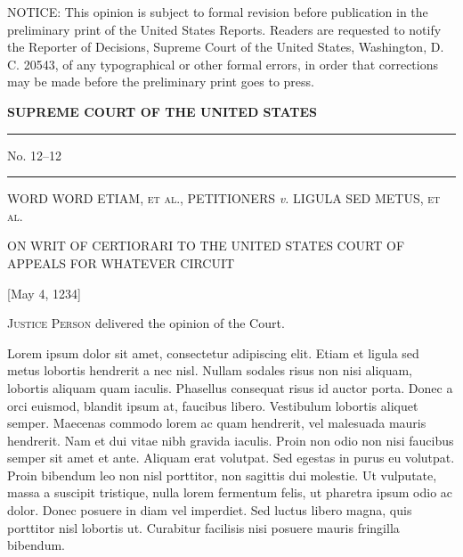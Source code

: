 \documentclass[11pt,twoside]{article}
\begin{document}
\begin{center}

  \begin{minipage}{3.46in}

    \noindent \scriptsize NOTICE: This opinion is subject to formal
    revision before publication in the preliminary print of the United
    States Reports. Readers are requested to notify the Reporter of
    Decisions, Supreme Court of the United States, Washington, D. C.
    20543, of any typographical or other formal errors, in order that
    corrections may be made before the preliminary print goes to
    press.

  \end{minipage}



  {\large \bfseries SUPREME COURT OF THE UNITED STATES}

  \rule{2cm}{.4pt}

  {\small No. 12--12}

  \rule{2cm}{.4pt}

  \textsc{WORD WORD ETIAM, et al., PETITIONERS} \emph{v.}
  \textsc{LIGULA SED METUS, et al.}

  \vspace{1ex}

  {\small ON WRIT OF CERTIORARI TO THE UNITED STATES COURT OF APPEALS
    FOR WHATEVER CIRCUIT}

  \vspace{1ex}

  {\small [May 4, 1234]}

\end{center}




\textsc{Justice Person} delivered the opinion of the Court.

Lorem ipsum dolor sit amet, consectetur adipiscing elit. Etiam et ligula sed metus lobortis hendrerit a nec nisl. Nullam sodales risus non nisi aliquam, lobortis aliquam quam iaculis. Phasellus consequat risus id auctor porta. Donec a orci euismod, blandit ipsum at, faucibus libero. Vestibulum lobortis aliquet semper. Maecenas commodo lorem ac quam hendrerit, vel malesuada mauris hendrerit. Nam et dui vitae nibh gravida iaculis. Proin non odio non nisi faucibus semper sit amet et ante. Aliquam erat volutpat. Sed egestas in purus eu volutpat. Proin bibendum leo non nisl porttitor, non sagittis dui molestie. Ut vulputate, massa a suscipit tristique, nulla lorem fermentum felis, ut pharetra ipsum odio ac dolor. Donec posuere in diam vel imperdiet. Sed luctus libero magna, quis porttitor nisl lobortis ut. Curabitur facilisis nisi posuere mauris fringilla bibendum.
\end{document}
